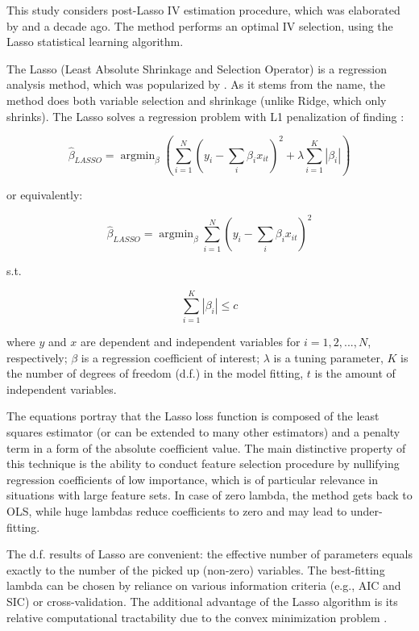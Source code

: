 \documentclass[alpha-refs]{wiley-article-04t}
\begin{document}
This study considers post-Lasso IV estimation procedure, which was elaborated by \citet{belloni_high_2011} and \citet{belloni_sparse_2012} a decade ago. The method performs an optimal IV selection, using the Lasso statistical learning algorithm.

The Lasso (Least Absolute Shrinkage and Selection Operator) is a regression analysis method, which was popularized by \citet{tibshirani_regression_1996}. As it stems from the name, the method does both variable selection and shrinkage (unlike Ridge, which only shrinks). The Lasso solves a regression problem with L1 penalization of finding \citep{diebold_econometric_2019}:

\begin{equation}\hat{\beta}_{L A S S O}=\operatorname{argmin}_{\beta}\left(\sum_{i=1}^{N}\left(y_{i}-\sum_{i} \beta_{i} x_{i t}\right)^{2}+\lambda \sum_{i=1}^{K}\left|\beta_{i}\right|\right)
\end{equation}

or equivalently:

\begin{equation}\hat{\beta}_{L A S S O}=\operatorname{argmin}_{\beta} \sum_{i=1}^{N}\left(y_{i}-\sum_{i} \beta_{i} x_{i t}\right)^{2}\end{equation}

s.t.

\begin{equation}\sum_{i=1}^{K}\left|\beta_{i}\right| \leq c\end{equation}

\noindent
where $y$ and $x$ are dependent and independent variables for $i = 1,2,...,N$, respectively; $\beta$ is a regression coefficient of interest; $\lambda$ is a tuning parameter, $K$ is the number of degrees of freedom (d.f.) in the model fitting, $t$ is the amount of independent variables.

The equations portray that the Lasso loss function is composed of the least squares estimator (or can be extended to many other estimators) and a penalty term in a form of the absolute coefficient value. The main distinctive property of this technique is the ability to conduct feature selection procedure by nullifying regression coefficients of low importance, which is of particular relevance in situations with large feature sets. In case of zero lambda, the method gets back to OLS, while huge lambdas reduce coefficients to zero and may lead to under-fitting.

The d.f. results of Lasso are convenient: the effective number of parameters equals exactly to the number of the picked up (non-zero) variables. The best-fitting lambda can be chosen by reliance on various information criteria (e.g., AIC and SIC) or cross-validation. The additional advantage of the Lasso algorithm is its relative computational tractability due to the convex minimization problem \citep{diebold_econometric_2019}.
\end{document}
